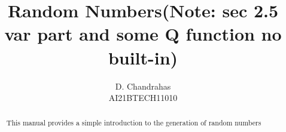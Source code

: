\documentclass[journal,12pt,twocolumn]{IEEEtran}
\renewcommand\thesection{\arabic{section}}
\begin{document}
\let\StandardTheFigure\thefigure
\renewcommand{\thefigure}{\thesection}



\makeatletter
{}
\makeatother

\let\StandardTheFigure\thefigure
\let\StandardTheTable\thetable
\let\vec\mathbf
{}

\vspace{3cm}


\title{%
	Random Numbers(Note: sec 2.5 var part and some Q function no built-in)
}

%
%
%

\author{D. Chandrahas\\AI21BTECH11010}
\maketitle

\tableofcontents

\bigskip

\renewcommand{\thefigure}{\theenumi}
\renewcommand{\thetable}{\theenumi}

\begin{abstract}
This manual provides a simple introduction to the generation of random numbers
\end{abstract}
\end{document}
